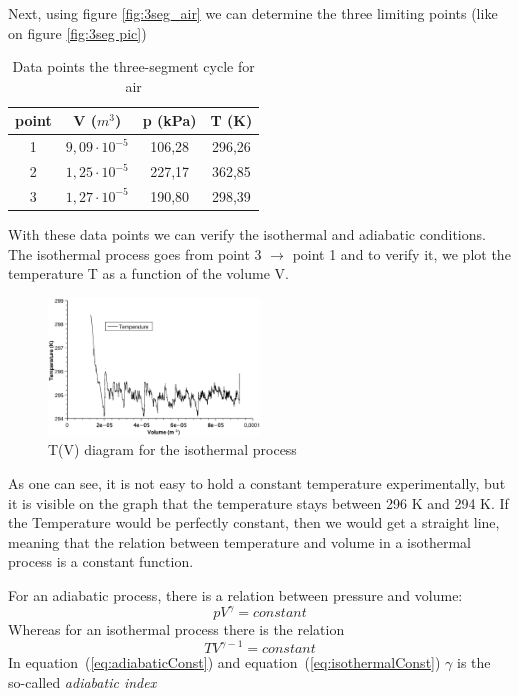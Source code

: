 \documentclass{scrartcl}
\begin{document}
Next, using figure \ref{fig:3seg_air} we can determine the three limiting points (like on figure \ref{fig:3seg pic})
\begin{table}[!ht]
    \centering
    \begin{tabular}{c|c|c|c}
        point & V ($m^3$) & p (kPa) & T (K)  \\
        \hline
        1 & $9,09 \cdot 10^{-5}$ & 106,28 & 296,26\\
        2 & $1,25 \cdot 10^{-5}$ & 227,17 & 362,85\\
        3 & $1,27 \cdot 10^{-5}$ & 190,80 & 298,39
    \end{tabular}
    \caption{Data points the three-segment cycle for air}
    \label{tab:Data_air}
\end{table}
With these data points we can verify the isothermal and adiabatic conditions. The isothermal process goes from point 3 $\rightarrow$ point 1 and to verify it, we plot the temperature T as a function of the volume V.
\begin{figure}[!ht]
    \centering
    \includegraphics[width=0.5\textwidth]{3seg/TV_isothermal.eps}
    \caption{T(V) diagram for the isothermal process}
    \label{fig:TV_isothermal3}
\end{figure}
As one can see, it is not easy to hold a constant temperature experimentally, but it is visible on the graph that the temperature stays between 296 K and 294 K. If the Temperature would be perfectly constant, then we would get a straight line, meaning that the relation between temperature and volume in a isothermal process is a constant function.

For an adiabatic process, there is a relation between pressure and volume: \begin{equation} p V^{\gamma} = constant \label{eq:adiabaticConst}\end{equation} Whereas for an isothermal process there is the relation \begin{equation} T V^{\gamma - 1} = constant \label{eq:isothermalConst} \end{equation} In equation~(\ref{eq:adiabaticConst}) and equation~(\ref{eq:isothermalConst}) $\gamma$ is the so-called \textit{adiabatic index} \cite{adiabaticIndex}
\end{document}
